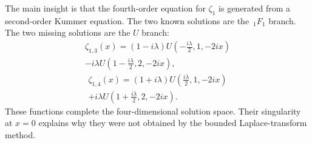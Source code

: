 \documentclass[%
 aip,
 jmp,%
 amsmath,amssymb,
 reprint,%
]{revtex4-2}
\begin{document}
The main insight is that the fourth-order equation for $\zeta_1$ is generated
from a second-order Kummer equation.  The two known solutions are the
$\,_1F_1$ branch.  The two missing solutions are the $U$ branch:
\begin{multline*}
\zeta_{1,3}(x)
=(1-i\lambda)U\left(-\frac{i\lambda}{2},1,-2ix\right)\\
-i\lambda U\left(1-\frac{i\lambda}{2},2,-2ix\right),
\end{multline*}
\begin{multline*}
\zeta_{1,4}(x)
=(1+i\lambda)U\left(\frac{i\lambda}{2},1,-2ix\right)\\
+i\lambda U\left(1+\frac{i\lambda}{2},2,-2ix\right).
\end{multline*}
These functions complete the four-dimensional solution space.  Their
singularity at $x=0$ explains why they were not obtained by the bounded
Laplace-transform method.

\nocite{*}

\end{document}
